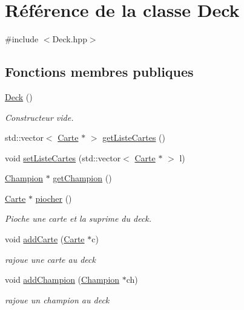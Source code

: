\hypertarget{class_deck}{\section{Référence de la classe Deck}
\label{class_deck}
}


{\ttfamily \#include $<$Deck.\-hpp$>$}

\subsection*{Fonctions membres publiques}
\begin{DoxyCompactItemize}
\item 
\hyperlink{class_deck_a57ae1cb4ac6fd61c249cefb2db85eb99}{Deck} ()
\begin{DoxyCompactList}\small\item\em Constructeur vide. \end{DoxyCompactList}\item 
std\-::vector$<$ \hyperlink{class_carte}{Carte} $\ast$ $>$ \hyperlink{class_deck_ab3f7a58ffccaeed56fb76939978396b9}{get\-Liste\-Cartes} ()
\item 
void \hyperlink{class_deck_a428e9abf1bf8c7cf6acb9371361759ef}{set\-Liste\-Cartes} (std\-::vector$<$ \hyperlink{class_carte}{Carte} $\ast$ $>$ l)
\item 
\hyperlink{class_champion}{Champion} $\ast$ \hyperlink{class_deck_a17dd89315d08272505adbc12ca857aec}{get\-Champion} ()
\item 
\hyperlink{class_carte}{Carte} $\ast$ \hyperlink{class_deck_a400a064a590119f8809d7a19e4f6704c}{piocher} ()
\begin{DoxyCompactList}\small\item\em Pioche une carte et la suprime du deck. \end{DoxyCompactList}\item 
void \hyperlink{class_deck_a3e12ffedb0635987a189e9a982dc5661}{add\-Carte} (\hyperlink{class_carte}{Carte} $\ast$c)
\begin{DoxyCompactList}\small\item\em rajoue une carte au deck \end{DoxyCompactList}\item 
void \hyperlink{class_deck_a773e994efea1dab3ee65f974ce6e6e39}{add\-Champion} (\hyperlink{class_champion}{Champion} $\ast$ch)
\begin{DoxyCompactList}\small\item\em rajoue un champion au deck \end{DoxyCompactList}\item 

\end{DoxyCompactItemize}
